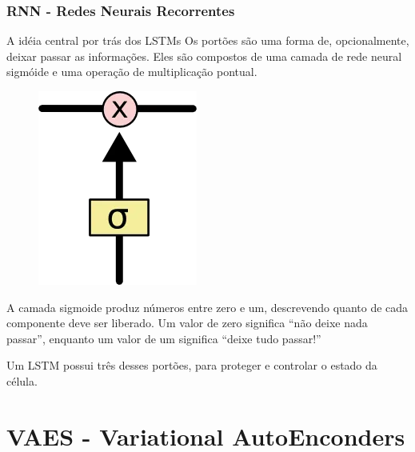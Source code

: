 \documentclass{beamer}
\begin{document}
\begin{frame}
	\frametitle{RNN - Redes Neurais Recorrentes}
	\begin{block}{A idéia central por trás dos LSTMs}
		Os portões são uma forma de, opcionalmente, deixar passar as informações. Eles são compostos de uma camada de rede neural sigmóide e uma operação de multiplicação pontual.
		\begin{figure}
			\centering
			\includegraphics[width=0.15\linewidth]{figures/lstm4}
		\end{figure}
		A camada sigmoide produz números entre zero e um, descrevendo quanto de cada componente deve ser liberado. Um valor de zero significa “não deixe nada passar”, enquanto um valor de um significa “deixe tudo passar!”
			
		Um LSTM possui três desses portões, para proteger e controlar o estado da célula.
		
		\href{https://medium.com/@web2ajax/redes-neurais-recorrentes-lstm-b90b720dc3f6}{}
		\href{https://colah.github.io/posts/2015-08-Understanding-LSTMs/}{}
	\end{block}
\end{frame}






\section{VAES - Variational AutoEnconders}
\end{document}
